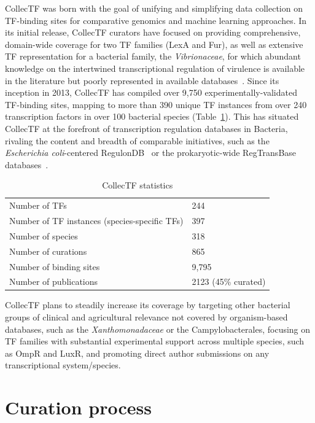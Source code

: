 CollecTF was born with the goal of unifying and simplifying data collection on
TF-binding sites for comparative genomics and machine learning approaches. In
its initial release, CollecTF curators have focused on providing comprehensive,
domain-wide coverage for two TF families (LexA and Fur), as well as extensive
TF representation for a bacterial family, the \textit{Vibrionaceae}, for which
abundant knowledge on the intertwined transcriptional regulation of virulence
is available in the literature but poorly represented in available
databases~\cite{matson2007regulatory}. Since its inception in 2013, CollecTF
has compiled over 9,750 experimentally-validated TF-binding sites, mapping to
more than 390 unique TF instances from over 240 transcription factors in over
100 bacterial species (Table~\ref{tab:collectf-stats}). This has situated
CollecTF at the forefront of transcription regulation databases in Bacteria,
rivaling the content and breadth of comparable initiatives, such as the
\textit{Escherichia coli}-centered RegulonDB~\cite{salgado2013regulondb} or the
prokaryotic-wide RegTransBase databases~\cite{kazakov2007regtransbase}.

\begin{table}
  \centering
  \caption{CollecTF statistics}
  \begin{tabular}{l l}
    \toprule
    Number of TFs & 244\\
    Number of TF instances (species-specific TFs) & 397\\
    Number of species & 318\\
    Number of curations & 865\\
    Number of binding sites & 9,795\\
    Number of publications & 2123 (45\% curated)\\
    \bottomrule
  \end{tabular}
  \label{tab:collectf-stats}
\end{table}

CollecTF plans to steadily increase its coverage by targeting other bacterial
groups of clinical and agricultural relevance not covered by organism-based
databases, such as the \textit{Xanthomonadaceae} or the Campylobacterales,
focusing on TF families with substantial experimental support across multiple
species, such as OmpR and LuxR, and promoting direct author submissions on any
transcriptional system/species.

\section{Curation process}

